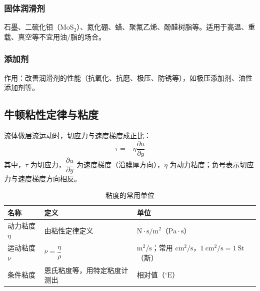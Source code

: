 \subsubsection{固体润滑剂}
\begin{definition}[固体润滑剂]
\label{def:固体润滑剂}
石墨、二硫化钼（$\mathrm{MoS}_2$）、氮化硼、蜡、聚氟乙烯、酚醛树脂等。适用于高温、重载、真空等不宜用油/脂的场合。
\end{definition}

\subsubsection{添加剂}
\begin{definition}[添加剂]
\label{def:添加剂}
作用：改善润滑剂的性能（抗氧化、抗磨、极压、防锈等），如极压添加剂、油性添加剂等。
\end{definition}

\subsection{牛顿粘性定律与粘度}

\begin{theorem}[牛顿粘性定律]
\label{thm:牛顿粘性定律}
流体做层流运动时，切应力与速度梯度成正比：
\begin{equation}
	\tau=-\eta\frac{\partial u}{\partial y}
	\label{eq:润滑:牛顿粘性定律}
\end{equation}
其中，$\tau$ 为切应力，$\dfrac{\partial u}{\partial y}$ 为速度梯度（沿膜厚方向），$\eta$ 为动力粘度；负号表示切应力与速度梯度方向相反。
\end{theorem}

\begin{definition}[粘度的常用单位]
\label{def:粘度单位}
\begin{table}[H]
\centering
\caption{粘度的常用单位}
\label{tab:润滑:粘度单位}
\begin{tabular}{p{1.9cm}p{5.6cm}p{4.9cm}}
	\toprule
	名称 & 定义 & 单位 \\
	\midrule
	动力粘度 $\eta$ & 由粘性定律定义 & $\mathrm{N\cdot s/m^2}$（$\mathrm{Pa\cdot s}$） \\
	运动粘度 $\nu$ & $\nu=\dfrac{\eta}{\rho}$ & $\mathrm{m^2/s}$；常用 $\mathrm{cm^2/s}$，$1\ \mathrm{cm^2/s}=1\ \mathrm{St}$（斯） \\
	条件粘度 & 恩氏粘度等，用特定粘度计测出 & 相对值（$^\circ\mathrm{E}$） \\
	\bottomrule
\end{tabular}
\end{table}
\end{definition}

